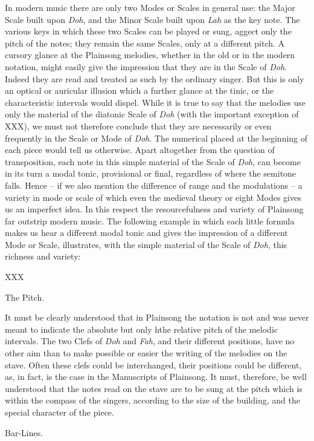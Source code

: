 In modern music there are only two Modes or Scales in general use: the Major Scale built upon {\it Doh}, and the Minor Scale built upon {\it Lah} as the key note. The various keys in which these two Scales can be played or sung, aggect only the pitch of the notes; they remain the same Scales, only at a different pitch. A cursory glance at the Plainsong melodies, whether in the old or in the modern notation, might easily give the impression that they are in the Scale of {\it Doh}. Indeed they are read and treated as such by the ordinary singer. But this is only an optical or auricular illusion which a further glance at the tinic, or the characteristic intervals would dispel. While it is true to say that the melodies use only the material of the diatonic Scale of {\it Doh} (with the important exception of XXX), we must not therefore conclude that they are necessarily or even frequently in the Scale or Mode of {\it Doh}. The numerical placed at the beginning of each piece would tell us otherwise. Apart altogether from the question of transposition, each note in this simple material of the Scale of {\it Doh}, can become in its turn a modal tonic, provisional or final, regardless of where the semitone falls. Hence -- if we also mention the difference of range and the modulations -- a variety in mode or scale of which even the medieval theory or eight Modes gives us an imperfect idea. In this respect the resourcefulness and variety of Plainsong far outstrip modern music. The following example in which each little formula makes us hear a different modal tonic and gives the impression of a different Mode or Scale, illustrates, with the simple material of the Scale of {\it Doh}, this richness and variety:

XXX

The Pitch.

It must be clearly understood that in Plainsong the notation is not and was never meant to indicate the absolute but only hthe relative pitch of the melodic intervals. The two Clefs of {\it Doh} and {\it Fah}, and their different positions, have no other aim than to make possible or easier the writing of the melodies on the stave. Often these clefs could be interchanged, their positions could be different, as, in fact, is the case in the Manuscripts of Plainsong. It must, therefore, be well understood that the notes read on the stave are to be sung at the pitch which is within the compass of the singers, according to the size of the building, and the special character of the piece.

Bar-Lines.

